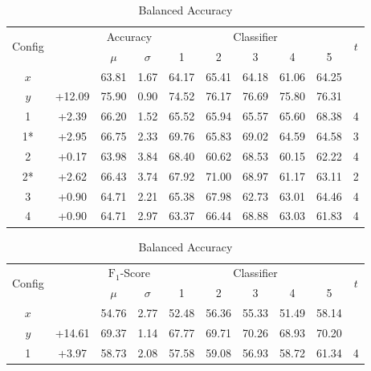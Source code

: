 \begin{table}[h]
	\begin{center}
		\begin{tabular}{c c c c c c c c c c}
			\toprule
			\multirow{2}{*}{Config} &
			 &
			\multicolumn{2}{c}{Accuracy} &
			\multicolumn{5}{c}{Classifier} &
			\multirow{2}{*}{$t$} \\
			\cmidrule(lr){3-4}
			\cmidrule(lr){5-9}
			 & & $\mu$ & $\sigma$ & 1 & 2 & 3 & 4 & 5 \\
			\cmidrule(lr){1-10}
			$x$\hphantom{*} &        & 63.81 & 1.67 & 64.17 & 65.41 & 64.18 & 61.06 & 64.25 &   \\
			$y$\hphantom{*} & +12.09 & 75.90 & 0.90 & 74.52 & 76.17 & 76.69 & 75.80 & 76.31 &   \\
			\cmidrule(lr){1-10}
			1\hphantom{*}   & +2.39  & 66.20 & 1.52 & 65.52 & 65.94 & 65.57 & 65.60 & 68.38 & 4 \\
			1*              & +2.95  & 66.75 & 2.33 & 69.76 & 65.83 & 69.02 & 64.59 & 64.58 & 3 \\
			2\hphantom{*}   & +0.17  & 63.98 & 3.84 & 68.40 & 60.62 & 68.53 & 60.15 & 62.22 & 4 \\
			2*              & +2.62  & 66.43 & 3.74 & 67.92 & 71.00 & 68.97 & 61.17 & 63.11 & 2 \\
			3\hphantom{*}   & +0.90  & 64.71 & 2.21 & 65.38 & 67.98 & 62.73 & 63.01 & 64.46 & 4 \\
			4\hphantom{*}   & +0.90  & 64.71 & 2.97 & 63.37 & 66.44 & 68.88 & 63.03 & 61.83 & 4 \\
			\bottomrule
		\end{tabular}
		\caption*{Balanced Accuracy}
	\end{center}
	\begin{center}
		\begin{tabular}{c c c c c c c c c c}
			\toprule
			\multirow{2}{*}{Config} &
			 &
			\multicolumn{2}{c}{$\text{F}_1$-Score} &
			\multicolumn{5}{c}{Classifier} &
			\multirow{2}{*}{$t$} \\
			\cmidrule(lr){3-4}
			\cmidrule(lr){5-9}
			 & & $\mu$ & $\sigma$ & 1 & 2 & 3 & 4 & 5 \\
			\cmidrule(lr){1-10}
			$x$\hphantom{*} &        & 54.76 & 2.77 & 52.48 & 56.36 & 55.33 & 51.49 & 58.14 &   \\
			$y$\hphantom{*} & +14.61 & 69.37 & 1.14 & 67.77 & 69.71 & 70.26 & 68.93 & 70.20 &   \\
			\cmidrule(lr){1-10}
			1\hphantom{*}   & +3.97  & 58.73 & 2.08 & 57.58 & 59.08 & 56.93 & 58.72 & 61.34 & 4 \\

\end{tabular}
\end{center}
\end{table}
